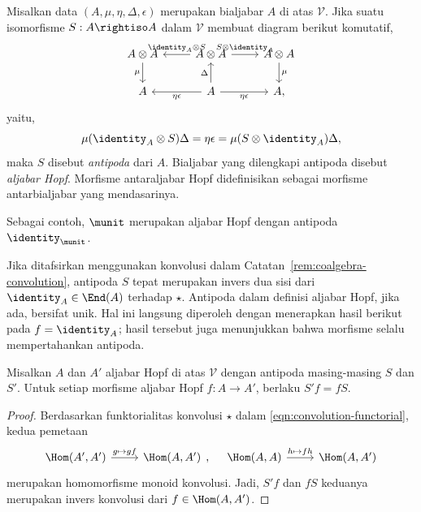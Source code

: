 \begin{definition}\label{def:Hopf-algebra}
	Misalkan data $(A,\mu,\eta,\Delta,\epsilon)$ merupakan bialjabar $A$ di
	atas $\mathcal{V}$. Jika suatu isomorfisme $S:A\rightiso A$ dalam
	$\mathcal{V}$ membuat diagram berikut komutatif,
	\[\begin{tikzcd}
		A \otimes A \arrow[d, "\mu"'] & A \otimes A \arrow[r, "{S \otimes \identity_A}"] \arrow[l, "{\identity_A \otimes S}"'] & A \otimes A \arrow[d, "\mu"] \\
		A & A \arrow[u, "\Delta"] \arrow[r, "\eta\epsilon"'] \arrow[l, "\eta\epsilon"] & A ,
	\end{tikzcd}\]
	yaitu,
	\[ \mu (\identity_A \otimes S) \Delta = \eta\epsilon = \mu (S \otimes \identity_A) \Delta, \]
	maka $S$ disebut \emph{antipoda} dari $A$. Bialjabar yang dilengkapi
	antipoda disebut \emph{aljabar Hopf}. Morfisme antaraljabar Hopf
	didefinisikan sebagai morfisme antarbialjabar yang
	mendasarinya.
\end{definition}

Sebagai contoh, $\munit$ merupakan aljabar Hopf dengan antipoda
$\identity_{\munit}$.

Jika ditafsirkan menggunakan konvolusi dalam
Catatan~\ref{rem:coalgebra-convolution}, antipoda $S$ tepat merupakan invers
dua sisi dari $\identity_A\in\End(A)$ terhadap $\star$. Antipoda dalam definisi
aljabar Hopf, jika ada, bersifat unik. Hal ini langsung diperoleh dengan
menerapkan hasil berikut pada $f=\identity_A$; hasil tersebut juga menunjukkan
bahwa morfisme selalu mempertahankan antipoda.

\begin{proposition}\label{prop:antipode-homo}
	Misalkan $A$ dan $A'$ aljabar Hopf di atas $\mathcal{V}$ dengan antipoda
	masing-masing $S$ dan $S'$. Untuk setiap morfisme aljabar Hopf
	$f:A\to A'$, berlaku $S'f=fS$.
\end{proposition}

\begin{proof}
	Berdasarkan funktorialitas konvolusi $\star$ dalam
	\eqref{eqn:convolution-functorial}, kedua pemetaan
	\[\begin{tikzcd}
		\Hom(A', A') \arrow[r, "{g \mapsto gf}"] & \Hom(A, A')
	\end{tikzcd}, \quad \begin{tikzcd}
		\Hom(A, A) \arrow[r, "{h \mapsto fh}"] & \Hom(A, A')
	\end{tikzcd}\]
	merupakan homomorfisme monoid konvolusi. Jadi, $S'f$ dan $fS$ keduanya
	merupakan invers konvolusi dari $f\in\Hom(A,A')$.
\end{proof}

